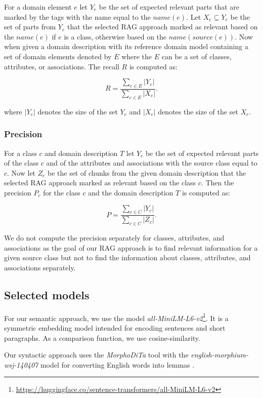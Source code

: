 For a domain element $e$ let $Y_e$ be the set of expected relevant parts that are marked by the tags with the name equal to the $name(e)$. Let $X_e \subseteq Y_e$ be the set of parts from $Y_e$ that the selected RAG approach marked as relevant based on the $name(e)$ if $e$ is a class, otherwise based on the $name(source(e))$. Now when given a domain description with its reference domain model containing a set of domain elements denoted by $E$ where the $E$ can be a set of classes, attributes, or associations. The recall $R$ is computed as:

\[ R = \dfrac{\sum_{e \in E}|Y_e|}{\sum_{e \in E}|X_e|}. \]

\noindent{}where $|Y_e|$ denotes the size of the set $Y_e$ and $|X_e|$ denotes the size of the set $X_e$.


\subsubsection{Precision}

For a class $c$ and domain description $T$ let $Y_{c}$ be the set of expected relevant parts of the class $c$ and of the attributes and associations with the source class equal to $c$. Now let $Z_{c}$ be the set of chunks from the given domain description that the selected RAG approach marked as relevant based on the class $c$. Then the precision $P_{c}$ for the class $c$ and the domain description $T$ is computed as:

\[ P = \dfrac{\sum_{c \in C}|Y_c|}{\sum_{c \in C}|Z_c|}. \]

We do not compute the precision separately for classes, attributes, and associations as the goal of our RAG approach is to find relevant information for a given source class but not to find the information about classes, attributes, and associations separately.


\subsection{Selected models}

For our semantic approach, we use the model \textit{all-MiniLM-L6-v2}\footnote{\url{https://huggingface.co/sentence-transformers/all-MiniLM-L6-v2}}. It is a symmetric embedding model intended for encoding sentences and short paragraphs. As a comparison function, we use cosine-similarity.

Our syntactic approach uses the \textit{MorphoDiTa} tool \cite{Strakova2014} with the \textit{english-morphium-wsj-140407} model for converting English words into lemmas \cite{Straka2014}.


